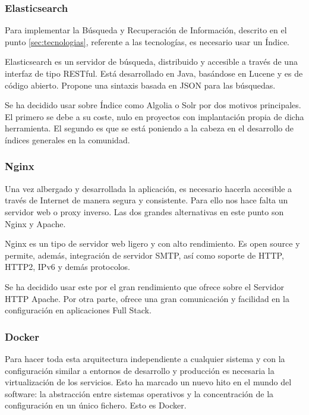 \subsubsection{Elasticsearch}

Para implementar la Búsqueda y Recuperación de Información, descrito en el punto \ref{sec:tecnologias}, referente a las tecnologías, es necesario usar un Índice.

Elasticsearch es un servidor de búsqueda, distribuido y accesible a través de una interfaz de tipo RESTful. Está desarrollado en Java, basándose en Lucene y es de código abierto. Propone una sintaxis basada en JSON para las búsquedas.

Se ha decidido usar sobre Índice como Algolia o Solr por dos motivos principales. El primero se debe a su coste, nulo en proyectos con implantación propia de dicha herramienta. El segundo es que se está poniendo a la cabeza en el desarrollo de índices generales en la comunidad.

\subsubsection{Nginx}

Una vez albergado y desarrollada la aplicación, es necesario hacerla accesible a través de Internet de manera segura y consistente. Para ello nos hace falta un servidor web o proxy inverso. Las dos grandes alternativas en este punto son Nginx y Apache.

Nginx es un tipo de servidor web ligero y con alto rendimiento. Es open source y permite, además, integración de servidor SMTP, así como soporte de HTTP, HTTP2, IPv6 y demás protocolos.

Se ha decidido usar este por el gran rendimiento que ofrece sobre el Servidor HTTP Apache. Por otra parte, ofrece una gran comunicación y facilidad en la configuración en aplicaciones Full Stack.

\subsubsection{Docker}

Para hacer toda esta arquitectura independiente a cualquier sistema y con la configuración similar a entornos de desarrollo y producción es necesaria la virtualización de los servicios. Esto ha marcado un nuevo hito en el mundo del software: la abstracción entre sistemas operativos y la concentración de la configuración en un único fichero. Esto es Docker.

